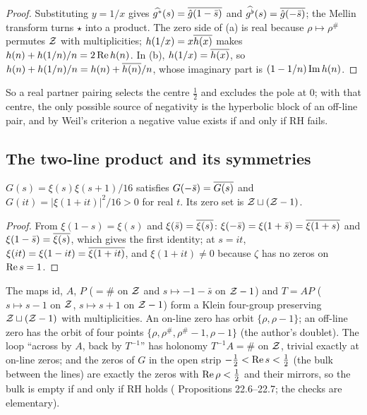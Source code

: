 \begin{proof}
Substituting $y=1/x$ gives $\widehat{g^*}(s)=\overline{\hat g(1-\bar s)}$ and $\widehat{g^\flat}(s)=\overline{\hat g(-\bar s)}$; the Mellin transform turns $\star$ into a product. The zero side of (a) is real because $\rho\mapsto\rho^\#$ permutes $\mathcal{Z}$ with multiplicities; $h(1/x)=x\overline{h(x)}$ makes $h(n)+h(1/n)/n=2\operatorname{Re} h(n)$. In (b), $h(1/x)=\overline{h(x)}$, so $h(n)+h(1/n)/n=h(n)+\overline{h(n)}/n$, whose imaginary part is $(1-1/n)\operatorname{Im} h(n)$.
\end{proof}

So a real partner pairing selects the centre $\tfrac12$ and excludes the pole at $0$; with that centre, the only possible source of negativity is the hyperbolic block of an off-line pair, and by Weil's criterion \cite{Weil,Bombieri} a negative value exists if and only if RH fails.

\subsection{The two-line product and its symmetries}

\begin{proposition}\label{prop:G}
$G(s)=\xi(s)\xi(s+1)/16$ satisfies $G(-\bar s)=\overline{G(s)}$ and $G(it)=|\xi(1+it)|^2/16>0$ for real $t$. Its zero set is $\mathcal{Z}\sqcup(\mathcal{Z}-1)$.
\end{proposition}

\begin{proof}
From $\xi(1-s)=\xi(s)$ and $\xi(\bar s)=\overline{\xi(s)}$: $\xi(-\bar s)=\xi(1+\bar s)=\overline{\xi(1+s)}$ and $\xi(1-\bar s)=\overline{\xi(s)}$, which gives the first identity; at $s=it$, $\xi(it)=\xi(1-it)=\overline{\xi(1+it)}$, and $\xi(1+it)\ne0$ because $\zeta$ has no zeros on $\operatorname{Re} s=1$.
\end{proof}

The maps $\mathrm{id}$, $A$, $P$ ($=\#$ on $\mathcal{Z}$ and $s\mapsto-1-\bar s$ on $\mathcal{Z}-1$) and $T=AP$ ($s\mapsto s-1$ on $\mathcal{Z}$, $s\mapsto s+1$ on $\mathcal{Z}-1$) form a Klein four-group preserving $\mathcal{Z}\sqcup(\mathcal{Z}-1)$ with multiplicities. An on-line zero has orbit $\{\rho,\rho-1\}$; an off-line zero has the orbit of four points $\{\rho,\rho^\#,\rho^\#-1,\rho-1\}$ (the author's doublet). The loop ``across by $A$, back by $T^{-1}$'' has holonomy $T^{-1}A=\#$ on $\mathcal{Z}$, trivial exactly at on-line zeros; and the zeros of $G$ in the open strip $-\tfrac12<\operatorname{Re} s<\tfrac12$ (the bulk between the lines) are exactly the zeros with $\operatorname{Re}\rho<\tfrac12$ and their mirrors, so the bulk is empty if and only if RH holds ( Propositions 22.6--22.7; the checks are elementary).

